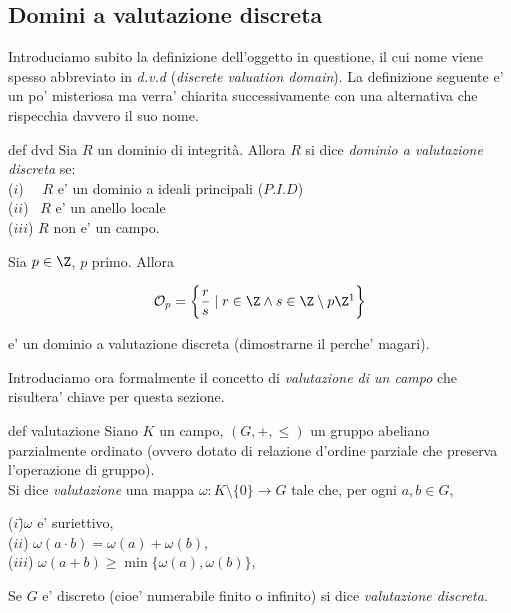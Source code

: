 \clearpage

\subsection{Domini a valutazione discreta}

Introduciamo subito la definizione dell'oggetto in questione, il cui nome viene spesso abbreviato in 
\emph{d.v.d} (\emph{discrete valuation domain}). La definizione seguente e' un po' misteriosa ma verra'
chiarita successivamente con una alternativa che rispecchia davvero il suo nome.


\begin{defn}{def dvd}
  Sia $R$ un dominio di integrità. Allora $R$ si dice \emph{dominio a valutazione discreta} se: \\
  \noindent ($i$) \ \ $R$ e' un dominio a ideali principali ($P.I.D$) \\
  \noindent ($ii$) \ $R$ e' un anello locale\\
  \noindent ($iii$) $R$ non e' un campo.
\end{defn}

\begin{exm}
  Sia $p\in \Z$, $p$ primo. Allora 

  \[ \mathcal{O}_p = \bigg\{ \frac{r}{s} \mid r \in \Z \land s \in \Z \setminus p\Z\footnotemark \bigg\} \]

  \noindent e' un dominio a valutazione discreta (dimostrarne il perche' magari).  
\end{exm}

\noindent Introduciamo ora formalmente il concetto di \emph{valutazione di un campo} che risultera' chiave per questa sezione.
\begin{defn}{def valutazione}
  Siano $K$ un campo, $(G, +, \leq)$ un gruppo abeliano parzialmente ordinato 
  (ovvero dotato di relazione d'ordine parziale che preserva l'operazione di gruppo). \\
  \noindent Si dice \emph{valutazione} una mappa $\omega : K \setminus \{0\} \rightarrow G$ tale che, per ogni $a,b \in G$,
  \begin{tabbing}
    ($i$)\quad\quad \=$\omega$ e' suriettivo, \\
    ($ii$)     \>$\omega(a\cdot b) = \omega(a) + \omega(b)$, \\
    ($iii$)    \>$\omega(a+b) \geq \min\{ \omega(a), \omega(b) \}$, 
  \end{tabbing}

  \noindent Se $G$ e' discreto (cioe' numerabile finito o infinito) si dice \emph{valutazione discreta}.
\end{defn}

